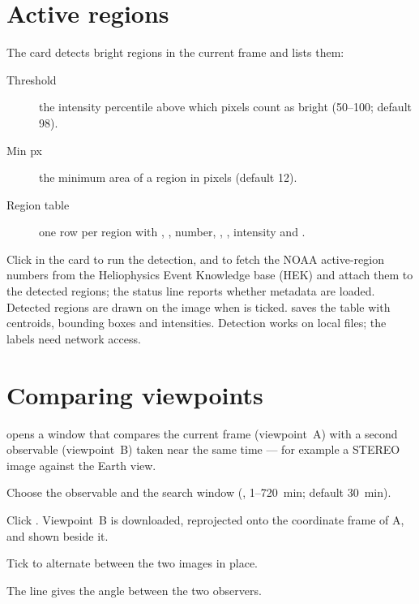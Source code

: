 \section{Active regions}
\label{sec:active-regions}

The  card detects bright regions in the current frame and lists them:
\begin{description}
  \item[Threshold] the intensity percentile above which pixels count as bright (50--100;
    default 98).
  \item[Min px] the minimum area of a region in pixels (default 12).
  \item[Region table] one row per region with , ,  number,
    , ,  intensity and .
\end{description}
Click  in the  card to run the detection, and
 to fetch the NOAA active-region numbers from the Heliophysics Event
Knowledge base (HEK) and attach them to the detected regions; the status line reports whether
metadata are loaded. Detected regions are drawn on the image when  is
ticked.  saves the table with centroids, bounding boxes and
intensities. Detection works on local files; the labels need network access.

\section{Comparing viewpoints}
\label{sec:compare-viewpoint}

 opens a window that compares the current frame (viewpoint~A) with a
second observable (viewpoint~B) taken near the same time --- for example a STEREO image
against the Earth view.
\begin{steps}
  \item Choose the  observable and the search window (, 1--720~min;
    default 30~min).
  \item Click . Viewpoint~B is downloaded, reprojected onto the
    coordinate frame of A, and shown beside it.
  \item Tick  to alternate between the two images in place.
\end{steps}
The  line gives the angle between the two observers.

